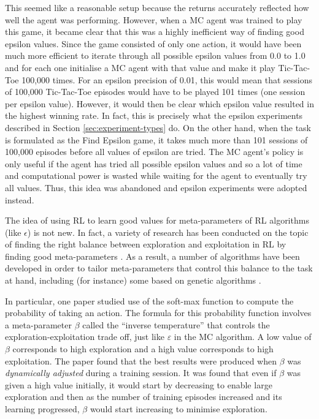 \documentclass[11pt,a4paper,twoside,openright]{report}
\begin{document}
This seemed like a reasonable setup because the returns accurately reflected how well the agent was performing. However, when a MC agent was trained to play this game, it became clear that this was a highly inefficient way of finding good epsilon values. Since the game consisted of only one action, it would have been much more efficient to iterate through all possible epsilon values from 0.0 to 1.0 and for each one initialise a MC agent with that value and make it play Tic-Tac-Toe 100,000 times. For an epsilon precision of 0.01, this would mean that sessions of 100,000 Tic-Tac-Toe episodes would have to be played 101 times (one session per epsilon value). However, it would then be clear which epsilon value resulted in the highest winning rate. In fact, this is precisely what the epsilon experiments described in Section \ref{sec:experiment-types} do. On the other hand, when the task is formulated as the Find Epsilon game, it takes much more than 101 sessions of 100,000 episodes before all values of epsilon are tried. The MC agent's policy is only useful if the agent has tried all possible epsilon values and so a lot of time and computational power is wasted while waiting for the agent to eventually try all values. Thus, this idea was abandoned and epsilon experiments were adopted instead.

The idea of using RL to learn good values for meta-parameters of RL algorithms (like $\epsilon$) is not new. In fact, a variety of research has been conducted on the topic of finding the right balance between exploration and exploitation in RL by finding good meta-parameters \cite{meta-optimization} \cite{meta-param-evolution} \cite{exploration-exploitation-meta-param} \cite{meta-learning-rl}. As a result, a number of algorithms have been developed in order to tailor meta-parameters that control this balance to the task at hand, including (for instance) some based on genetic algorithms \cite{meta-param-evolution}.

In particular, one paper \cite{meta-learning-rl} studied use of the soft-max function to compute the probability of taking an action. The formula for this probability function involves a meta-parameter $\beta$ called the ``inverse temperature'' that controls the exploration-exploitation trade off, just like $\varepsilon$ in the MC algorithm. A low value of $\beta$ corresponds to high exploration and a high value corresponds to high exploitation. The paper found that the best results were produced when $\beta$ was \emph{dynamically adjusted} during a training session. It was found that even if $\beta$ was given a high value initially, it would start by decreasing to enable large exploration and then as the number of training episodes increased and its learning progressed, $\beta$ would start increasing to minimise exploration.
\end{document}
